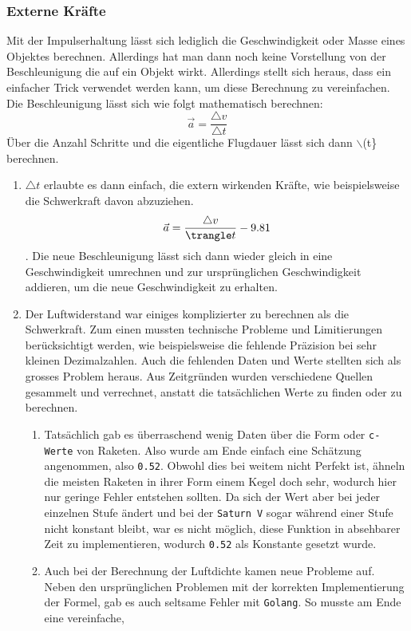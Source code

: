 \documentclass[11pt]{article}
\begin{document}
\subsubsection{Externe Kräfte}
\label{sec:org2a57000}
Mit der Impulserhaltung lässt sich lediglich die Geschwindigkeit oder Masse
eines Objektes berechnen. Allerdings hat man dann noch keine Vorstellung von der
Beschleunigung die auf ein Objekt wirkt. Allerdings stellt sich heraus, dass ein
einfacher Trick verwendet werden kann, um diese Berechnung zu vereinfachen. Die
Beschleunigung lässt sich wie folgt mathematisch berechnen: \[\vec{a} =
\frac{\triangle v}{\triangle t}\] Über die Anzahl Schritte und die eigentliche
Flugdauer lässt sich dann $\backslash$(\triangle t\} berechnen.
\begin{enumerate}
\item \(\triangle t\) erlaubte es dann einfach, die extern wirkenden Kräfte, wie
beispielsweise die Schwerkraft davon abzuziehen. \[\vec{a} = \frac{\triangle
   v}{\trangle t} - 9.81\]. Die neue Beschleunigung lässt sich dann wieder
gleich in eine Geschwindigkeit umrechnen und zur ursprünglichen
Geschwindigkeit addieren, um die neue Geschwindigkeit zu erhalten.
\item Der Luftwiderstand war einiges komplizierter zu berechnen als die
Schwerkraft. Zum einen mussten technische Probleme und Limitierungen
berücksichtigt werden, wie beispielsweise die fehlende Präzision bei sehr
kleinen Dezimalzahlen. Auch die fehlenden Daten und Werte stellten sich als
grosses Problem heraus. Aus Zeitgründen wurden verschiedene Quellen gesammelt
und verrechnet, anstatt die tatsächlichen Werte zu finden oder zu berechnen.
\begin{enumerate}
\item Tatsächlich gab es überraschend wenig Daten über die Form oder \texttt{c-Werte} von
Raketen. Also wurde am Ende einfach eine Schätzung angenommen, also \texttt{0.52}.
Obwohl dies bei weitem nicht Perfekt ist, ähneln die meisten Raketen in
ihrer Form einem Kegel doch sehr, wodurch hier nur geringe Fehler
entstehen sollten. Da sich der Wert aber bei jeder einzelnen Stufe ändert
und bei der \texttt{Saturn V} sogar während einer Stufe nicht konstant bleibt, war
es nicht möglich, diese Funktion in absehbarer Zeit zu implementieren,
wodurch \texttt{0.52} als Konstante gesetzt wurde.
\item Auch bei der Berechnung der Luftdichte kamen neue Probleme auf. Neben den
ursprünglichen Problemen mit der korrekten Implementierung der Formel, gab
es auch seltsame Fehler mit \texttt{Golang}. So musste am Ende eine vereinfache,

\end{enumerate}
\end{enumerate}
\end{document}
